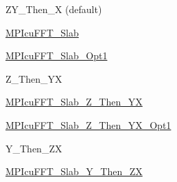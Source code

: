 
\begin{DoxyItemize}
\item ZY\+\_\+\+Then\+\_\+X (default)
\begin{DoxyEnumerate}
\item \mbox{\hyperlink{classMPIcuFFT__Slab}{MPIcu\+FFT\+\_\+\+Slab}}
\item \mbox{\hyperlink{classMPIcuFFT__Slab__Opt1}{MPIcu\+FFT\+\_\+\+Slab\+\_\+\+Opt1}}
\end{DoxyEnumerate}
\item Z\+\_\+\+Then\+\_\+\+YX
\begin{DoxyEnumerate}
\item \mbox{\hyperlink{classMPIcuFFT__Slab__Z__Then__YX}{MPIcu\+FFT\+\_\+\+Slab\+\_\+\+Z\+\_\+\+Then\+\_\+\+YX}}
\item \mbox{\hyperlink{classMPIcuFFT__Slab__Z__Then__YX__Opt1}{MPIcu\+FFT\+\_\+\+Slab\+\_\+\+Z\+\_\+\+Then\+\_\+\+YX\+\_\+\+Opt1}}
\end{DoxyEnumerate}
\item Y\+\_\+\+Then\+\_\+\+ZX
\begin{DoxyEnumerate}
\item \mbox{\hyperlink{classMPIcuFFT__Slab__Y__Then__ZX}{MPIcu\+FFT\+\_\+\+Slab\+\_\+\+Y\+\_\+\+Then\+\_\+\+ZX}} 
\end{DoxyEnumerate}
\end{DoxyItemize}